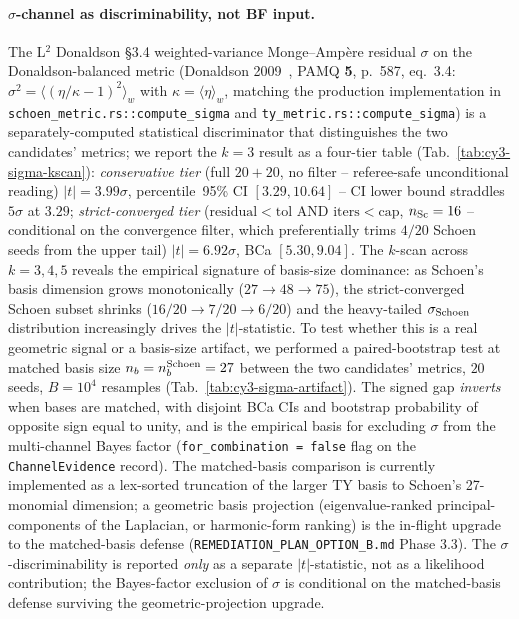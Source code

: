 ﻿\documentclass[reprint,amsmath,amssymb,aps,prd,longbibliography,floatfix]{revtex4-2}
\begin{document}
\paragraph{$\sigma$-channel as discriminability, not BF input.}
The L$^2$ Donaldson §3.4 weighted-variance Monge--Ampère residual $\sigma$ on the Donaldson-balanced metric (Donaldson 2009~\cite{Donaldson2009}, PAMQ \textbf{5}, p.~587, eq.~3.4: $\sigma^2 = \langle (\eta/\kappa - 1)^2 \rangle_{w}$ with $\kappa = \langle \eta \rangle_{w}$, matching the production implementation in \texttt{schoen\_metric.rs::compute\_sigma} and \texttt{ty\_metric.rs::compute\_sigma}) is a separately-computed statistical discriminator that distinguishes the two candidates' metrics; we report the $k=3$ result as a four-tier table (Tab.~\ref{tab:cy3-sigma-kscan}): \emph{conservative tier} (full $20{+}20$, no filter -- referee-safe unconditional reading) $|t| = 3.99\sigma$, percentile~95\% CI $[3.29, 10.64]$ -- CI lower bound straddles $5\sigma$ at $3.29$; \emph{strict-converged tier} ($\mathrm{residual}<\mathrm{tol}$ AND $\mathrm{iters}<\mathrm{cap}$, $n_{\rm Sc}=16$ -- conditional on the convergence filter, which preferentially trims $4/20$ Schoen seeds from the upper tail) $|t| = 6.92\sigma$, BCa $[5.30, 9.04]$. The $k$-scan across $k=3,4,5$ reveals the empirical signature of basis-size dominance: as Schoen's basis dimension grows monotonically ($27 \to 48 \to 75$), the strict-converged Schoen subset shrinks ($16/20 \to 7/20 \to 6/20$) and the heavy-tailed $\sigma_{\rm Schoen}$ distribution increasingly drives the $|t|$-statistic. To test whether this is a real geometric signal or a basis-size artifact, we performed a paired-bootstrap test at matched basis size $n_b = n_b^{\rm Schoen} = 27$ between the two candidates' metrics, $20$ seeds, $B = 10^4$ resamples (Tab.~\ref{tab:cy3-sigma-artifact}). The signed gap \emph{inverts} when bases are matched, with disjoint BCa CIs and bootstrap probability of opposite sign equal to unity, and is the empirical basis for excluding $\sigma$ from the multi-channel Bayes factor (\texttt{for\_combination = false} flag on the \texttt{ChannelEvidence} record). The matched-basis comparison is currently implemented as a lex-sorted truncation of the larger TY basis to Schoen's 27-monomial dimension; a geometric basis projection (eigenvalue-ranked principal-components of the Laplacian, or harmonic-form ranking) is the in-flight upgrade to the matched-basis defense (\texttt{REMEDIATION\_PLAN\_OPTION\_B.md} Phase 3.3). The $\sigma$-discriminability is reported \emph{only} as a separate $|t|$-statistic, not as a likelihood contribution; the Bayes-factor exclusion of $\sigma$ is conditional on the matched-basis defense surviving the geometric-projection upgrade.
\end{document}
